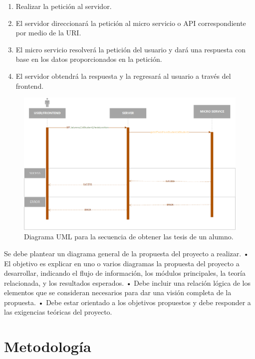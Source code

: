     \begin{enumerate}
        \item Realizar la petición al servidor.
        \item El servidor direccionará la petición al micro servicio o API correspondiente por medio de la URI.
        \item El micro servicio resolverá la petición del usuario y dará una respuesta con base en los datos proporcionados en la petición.
        \item El servidor obtendrá la respuesta y la regresará al usuario a través del frontend.
    \end{enumerate}
    
    \begin{figure}[H]
        \centering
        \includegraphics[width=\textwidth]{Propuesta_Plantilla_Tesis_LaTeX_UAG/imagenes/getAllTesisFromStudents_sequence_diagram.png}
        \caption{Diagrama UML para la secuencia de obtener las tesis de un alumno.}
        \label{fig:getAllTesisFromStudents}
    \end{figure}
    
    Se debe plantear un diagrama general de la propuesta del
    proyecto a realizar.
    • El objetivo es explicar en uno o varios diagramas la
    propuesta del proyecto a desarrollar, indicando el flujo de
    información, los módulos principales, la teoría relacionada,
    y los resultados esperados.
    • Debe incluir una relación lógica de los elementos que se
    consideran necesarios para dar una visión completa de la
    propuesta.
    • Debe estar orientado a los objetivos propuestos y debe
    responder a las exigencias teóricas del proyecto.

\section{Metodología}

